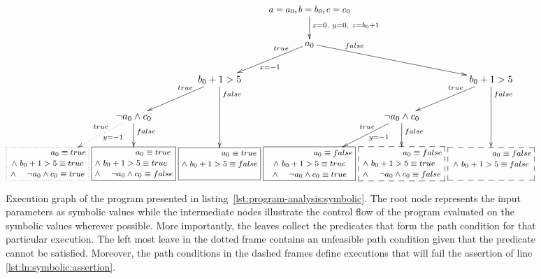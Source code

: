\begin{figure}[t]	
	\centering
	\[\xymatrix@C=0.3em{
		 & & & \ar[d]^{x = 0,~y = 0,~z = b_{0} + 1} \txt{\small $a = a_{0},b = b_{0}, c = c_{0}$} \\
		 & & & \ar@{}[ld]_<(0.2){true} \ar[ld]^{x=-1} a_{0} \ar[rrd] \ar@{}[rrd]^<(0.2){false} \\
		 & & \ar@{}[ld]_<(0.2){true} \ar[ld] b_{0} + 1 > 5 \ar[dd] \ar@{}[dd]^<(0.1){false} & & & \ar@{}[ld]_<(0.2){true} \ar[ld] b_{0} + 1 > 5 \ar[dd] \ar@{}[dd]^<(0.1){false} \\ 
		 & \ar@{}[ld]_<(0.2){true} \ar@{.>}[ld]^>(0.5){y=-1} \neg a_{0} \land c_{0} \ar[d] \ar@{}[d]^<(0.2){false} & & & \ar@{}[ld]_<(0.2){true} \ar[ld]^>(0.5){y=-1} \neg a_{0} \land c_{0} \ar[d] \ar@{}[d]^<(0.2){false} & & & \\
		 *+[F.] \txt{\footnotesize $~~~~~~~~~~~~~~~a_{0} \equiv true$ 
		   \\ \footnotesize $\land ~b_{0}+1 > 5 \equiv true$ 
		   \\ \footnotesize $\land ~~~~\neg a_{0} \land c_{0} \equiv true$} & 
		 *+[F] \txt{\footnotesize $~~~~~~~~~~~~~~a_{0} \equiv true$ 
		   \\ \footnotesize $\land ~b_{0}+1 > 5 \equiv true~~$ 
		   \\ \footnotesize $\land ~~~~\neg a_{0} \land c_{0} \equiv false$} & 
		 *+[F] \txt{\footnotesize $~~~~~~~~~~~~~~a_{0} \equiv true$ 
		   \\ \footnotesize $\land ~b_{0}+1 > 5 \equiv false$
		   \\ ~} & 
		 *+[F] \txt{\footnotesize $~~~~~~~~~~~~~~~~~a_{0} \equiv false$ 
		   \\ \footnotesize $\land ~b_{0}+1 > 5 \equiv true$ 
		   \\ \footnotesize $~\land ~~~~\neg a_{0} \land c_{0} \equiv true ~$} &
		 *+[F--] \txt{\footnotesize $~~~~~~~~~~~~~~~a_{0} \equiv false$ 
		   \\ \footnotesize $\land ~b_{0}+1 > 5 \equiv true~~$ 
		   \\ \footnotesize $\land ~~~~\neg a_{0} \land c_{0} \equiv false$} &
		 *+[F--] \txt{\footnotesize $~~~~~~~~~~~~~~~a_{0} \equiv false$ 
		   \\ \footnotesize $\land ~ b_{0}+1 > 5 \equiv false$
		   \\ ~}			
		} \]
	\caption{Execution graph of the program presented in listing~\ref{lst:program-analysis:symbolic}. The root node represents the input parameters as symbolic values while the intermediate nodes illustrate the control flow of the program evaluated on the symbolic values wherever possible. More importantly, the leaves collect the predicates that form the path condition for that particular execution. The left most leave in the dotted frame contains an unfeasible path condition given that the predicate cannot be satisfied. Moreover, the path conditions in the dashed frames define executions that will fail the assertion of line \ref{lst:ln:symbolic:assertion}.}
	\label{fig:program-analysis:symbolic}
\end{figure}

